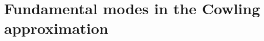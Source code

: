 \documentclass[aps,prd,twocolumn,superscriptaddress,footinbib]{revtex4-1}
\begin{document}

\renewcommand{\theequation}{B\arabic{equation}}
\section{Fundamental modes in the Cowling approximation} \label{sec:cowling}
\end{document}
